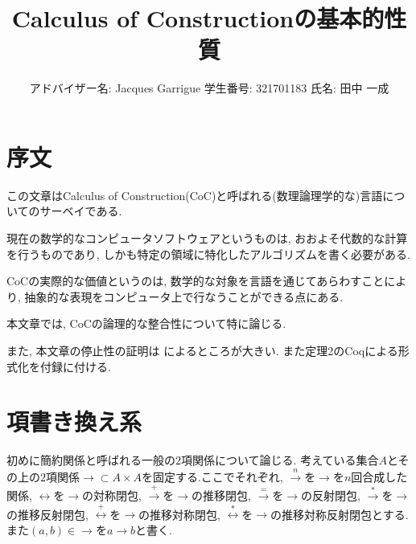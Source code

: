 \documentclass[12pt, titlepage]{ltjsarticle}
\begin{document}
\theoremstyle{definition}
\newtheorem{defn}{定義}
\newtheorem{thm}{定理}
\newtheorem{lem}{補題}
\newtheorem{rem}{注意}
\newtheorem{cor}{系}
\newtheorem{ex}{例}
\renewcommand{\proofname}{\bf{証明}}

\title{Calculus of Constructionの基本的性質}
\author{
アドバイザー名: Jacques Garrigue
学生番号: 321701183
氏名: 田中 一成
}
\maketitle

%
%

\section{序文}
この文章はCalculus of Construction(CoC)と呼ばれる(数理論理学的な)言語についてのサーベイである.

現在の数学的なコンピュータソフトウェアというものは, おおよそ代数的な計算を行うものであり, しかも特定の領域に特化したアルゴリズムを書く必要がある.

CoCの実際的な価値というのは, 数学的な対象を言語を通じてあらわすことにより,
抽象的な表現をコンピュータ上で行なうことができる点にある.

本文章では, CoCの論理的な整合性について特に論じる.

また, 本文章の停止性の証明は \cite{geuvers1994short}によるところが大きい.
また定理2のCoqによる形式化を付録に付ける.

\section{項書き換え系}
初めに簡約関係と呼ばれる一般の$2$項関係について論じる. 考えている集合$A$とその上の$2$項関係$\rightarrow \subset A \times A$を固定する.ここでそれぞれ,
$\xrightarrow{n}$を$\rightarrow$を$n$回合成した関係,
$\leftrightarrow$を$\rightarrow$の対称閉包,
$\xrightarrow{+}$を$\rightarrow$の推移閉包,
$\xrightarrow{=}$を$\rightarrow$の反射閉包,
$\overset{*}{\rightarrow}$を$\rightarrow$の推移反射閉包,
$\overset{+}{\leftrightarrow}$を$\rightarrow$の推移対称閉包,
$\overset{*}{\leftrightarrow}$を$\rightarrow$の推移対称反射閉包とする.
また$(a, b) \in \rightarrow$を$a \rightarrow b$と書く.
\end{document}
